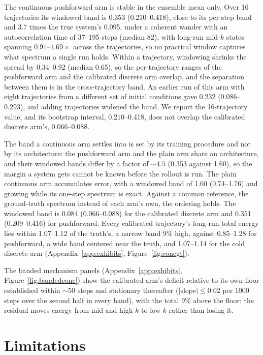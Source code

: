 \documentclass{article}
\begin{document}
The continuous pushforward arm is stable in the ensemble mean only. Over 16 trajectories
its windowed band is 0.353 (0.210--0.418), close to its per-step band and 3.7 times the
true system's 0.095, under a coherent wander with an autocorrelation time of 37--195 steps
(median 82), with long-run mid-$k$ states spanning $0.91$--$1.69{\times}$ across the
trajectories, so no practical window captures what spectrum a single run holds. Within a trajectory, 
windowing shrinks the spread by 0.34--0.92 (median 0.65), so the per-trajectory ranges of the pushforward arm and
the calibrated discrete arm overlap, and the separation between them is in the
cross-trajectory band. An earlier run of this arm with eight
trajectories from a different set of initial conditions gave 0.232 (0.086--0.293), and adding
trajectories widened the band. We report the 16-trajectory value, and its bootstrap interval,
0.210--0.418, does not overlap the calibrated discrete arm's, 0.066--0.088.

The band a continuous arm settles into is set by its training procedure and
not by its architecture: the pushforward arm and the plain arm share an architecture, and
their windowed bands differ by a factor of ${\sim}4.5$ (0.353 against 1.60), so the
margin a system gets cannot be known before the rollout is run. The plain continuous arm accumulates error, with a windowed band of 1.60
(0.74--1.76) and growing while its one-step spectrum is exact. Against a common reference,
the ground-truth spectrum instead of each arm's own, the ordering holds. The windowed band
is 0.084 (0.066--0.088) for the calibrated discrete arm and 0.351 (0.209--0.416) for
pushforward. Every calibrated trajectory's long-run total energy lies within 1.07--1.12 of
the truth's, a narrow band 9\% high, against 0.85--1.28 for pushforward, a wide band
centered near the truth, and 1.07--1.14 for the cold discrete arm (Appendix~\ref{app:exhibits}, Figure~\ref{fig:concgt}).

The banded mechanism panels (Appendix~\ref{app:exhibits}, Figure~\ref{fig:bandedconc}) show the calibrated arm's deficit
relative to its own floor established within ${\sim}50$ steps and stationary thereafter
($|$slope$| \leq 0.02$ per 1000 steps over the second half in every band), with the total
9\% above the floor: the residual moves energy from mid and high $k$ to low $k$ rather than
losing it.


\section{Limitations}
\label{sec:limitations}
\end{document}
